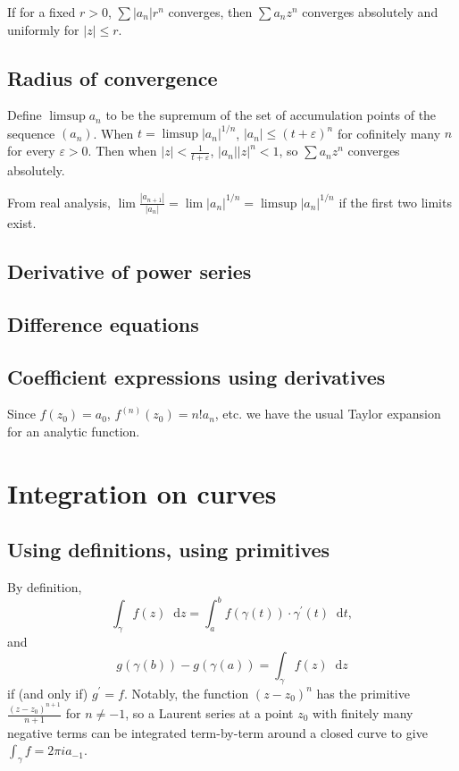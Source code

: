 \documentclass{article}
\newcommand\dif{\mathop{}\!\mathrm{d}}
\begin{document}
If for a fixed $r > 0$, $\sum |a_n| r^n$ converges, then
$\sum a_n z^n$ converges absolutely and uniformly for
$|z| \leq r$.

\subsection{Radius of convergence}
Define $\limsup a_n$ to be the supremum of the set of accumulation
points of the sequence $(a_n)$.
When $t = \limsup |a_n|^{1 / n}$,
$|a_n| \leq (t + \varepsilon)^n$ for cofinitely many $n$
for every $\varepsilon > 0$. Then
when $|z| < \frac{1}{t + \varepsilon}$,
$|a_n| |z|^n < 1$, so $\sum a_n z^n$ converges absolutely.

From real analysis,
$ \lim \frac{|a_{n+1}|}{|a_n|}
= \lim |a_n|^{1 / n}
= \limsup |a_n|^{1 / n}$ if the first two limits exist.

\subsection{Derivative of power series}

\subsection{Difference equations}

\subsection{Coefficient expressions using derivatives}
Since $f(z_0) = a_0$, $f^{(n)}(z_0) = n! a_n$, etc.
we have the usual Taylor expansion for an analytic function.


\section{Integration on curves}

\subsection{Using definitions, using primitives}
By definition,
$$
  \int_\gamma
    f(z)
    \dif z
= \int_a^b
    f(\gamma(t)) \cdot \gamma^\prime(t)
    \dif t,
$$
and
$$
  g(\gamma(b)) - g(\gamma(a))
= \int_\gamma
    f(z) \dif z
$$
if (and only if) $g^\prime = f$. Notably, the function $(z - z_0)^n$ has the
primitive $\frac{(z - z_0)^{n+1}}{n + 1}$ for $n \neq -1$, so a Laurent series
at a point $z_0$ with finitely many negative terms can be integrated
term-by-term around a closed curve to give $\int_\gamma f = 2 \pi i a_{-1}$.
\end{document}
